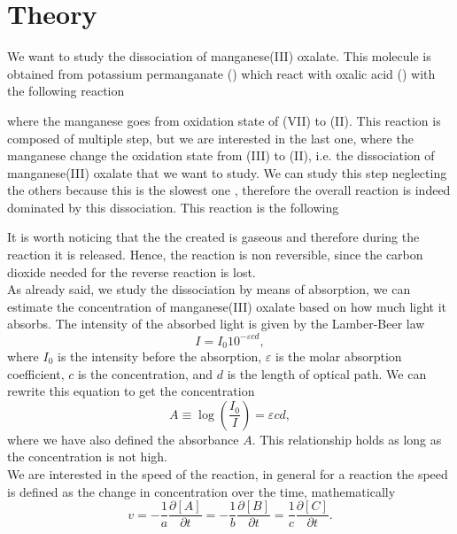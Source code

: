 \documentclass[a4paper,10pt]{article}
\begin{document}
\section{Theory}
We want to study the dissociation of manganese(III) oxalate. This molecule is obtained from potassium permanganate () which react with oxalic acid () with the following reaction
\begin{center}
\end{center} 
where the manganese goes from oxidation state of (VII) to (II). This reaction is composed of multiple step, but we are interested in the last one, where the manganese change the oxidation state from (III) to (II), i.e. the dissociation of manganese(III) oxalate that we want to study. We can study this step neglecting the others because this is the slowest one \cite{manganese}, therefore the overall reaction is indeed dominated by this dissociation. This reaction is the following \cite{taube}
\begin{center}
\end{center} 
It is worth noticing that the the  created is gaseous and therefore during the reaction it is released. Hence, the reaction is non reversible, since the carbon dioxide needed for the reverse reaction is lost.\\
As already said, we study the dissociation by means of absorption, we can estimate the concentration of manganese(III) oxalate based on how much light it absorbs. The intensity of the absorbed light is given by the Lamber-Beer law
\[I = I_0 10^{-\varepsilon c d },\]
where $I_0$ is the intensity before the absorption, $\varepsilon$ is the molar absorption coefficient, $c$ is the concentration, and $d$ is the length of optical path. We can rewrite this equation to get the concentration
\begin{equation}\label{absorbance}A \equiv \log\left(\frac{I_0}{I}\right) = \varepsilon c d,\end{equation}
where we have also defined the absorbance $A$. This relationship holds as long as the concentration is not high.\\
We are interested in the speed of the reaction, in general for a reaction  the speed is defined as the change in concentration over the time, mathematically
\[v = -\frac{1}{a}\frac{\partial[A]}{\partial t} = -\frac{1}{b}\frac{\partial[B]}{\partial t} = \frac{1}{c}\frac{\partial[C]}{\partial t}.\]
\end{document}
